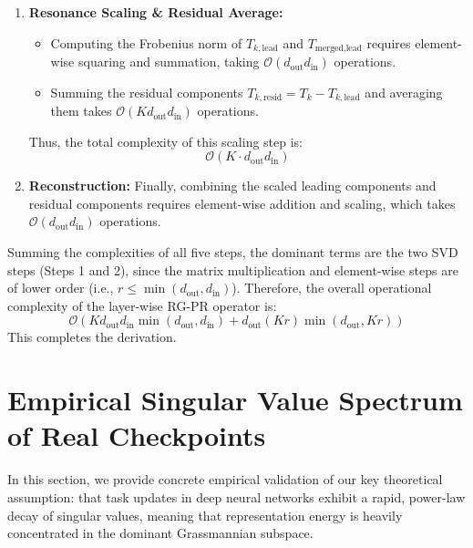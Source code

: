 \documentclass{article}
\theoremstyle{plain}
\theoremstyle{definition}
\theoremstyle{remark}
\begin{document}
\begin{enumerate}
    \item \textbf{Resonance Scaling \& Residual Average:}
    \begin{itemize}
        \item Computing the Frobenius norm of $T_{k, \text{lead}}$ and $T_{\text{merged}, \text{lead}}$ requires element-wise squaring and summation, taking $\mathcal{O}(d_{\text{out}} d_{\text{in}})$ operations.
        \item Summing the residual components $T_{k, \text{resid}} = T_k - T_{k, \text{lead}}$ and averaging them takes $\mathcal{O}(K d_{\text{out}} d_{\text{in}})$ operations.
    \end{itemize}
    Thus, the total complexity of this scaling step is:
    \begin{equation}
        \mathcal{O}\left( K \cdot d_{\text{out}} d_{\text{in}} \right)
    \end{equation}

    \item \textbf{Reconstruction:} Finally, combining the scaled leading components and residual components requires element-wise addition and scaling, which takes $\mathcal{O}(d_{\text{out}} d_{\text{in}})$ operations.
\end{enumerate}

Summing the complexities of all five steps, the dominant terms are the two SVD steps (Steps 1 and 2), since the matrix multiplication and element-wise steps are of lower order (i.e., $r \le \min(d_{\text{out}}, d_{\text{in}})$). Therefore, the overall operational complexity of the layer-wise RG-PR operator is:
\begin{equation}
    \mathcal{O}\left( K d_{\text{out}} d_{\text{in}} \min(d_{\text{out}}, d_{\text{in}}) + d_{\text{out}} (Kr) \min(d_{\text{out}}, Kr) \right)
\end{equation}
This completes the derivation.

\newpage
\section{Empirical Singular Value Spectrum of Real Checkpoints}
\label{app:empirical_spectral}

In this section, we provide concrete empirical validation of our key theoretical assumption: that task updates in deep neural networks exhibit a rapid, power-law decay of singular values, meaning that representation energy is heavily concentrated in the dominant Grassmannian subspace.
\end{document}
